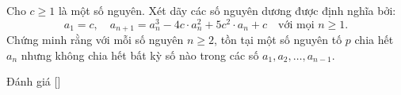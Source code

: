\ifshowproblem
\begin{problem}\label{problem:TWN-2015-TST3-M1-P3}
    Cho \( c \ge 1 \) là một số nguyên. Xét dãy các số nguyên dương được định nghĩa bởi:
    \[
        a_1 = c,\quad a_{n+1} = a_n^3 - 4c\cdot a_n^2 + 5c^2\cdot a_n + c \quad \text{với mọi } n \ge 1.
    \]
    Chứng minh rằng với mỗi số nguyên \( n \ge 2 \), tồn tại một số nguyên tố \( p \) chia hết \( a_n \)
    nhưng không chia hết bất kỳ số nào trong các số \( a_1, a_2, \ldots, a_{n-1} \).
\end{problem}
\fi

\ifshowinfo
Đánh giá [\textbf{}]\footnotemark
{}
\fi